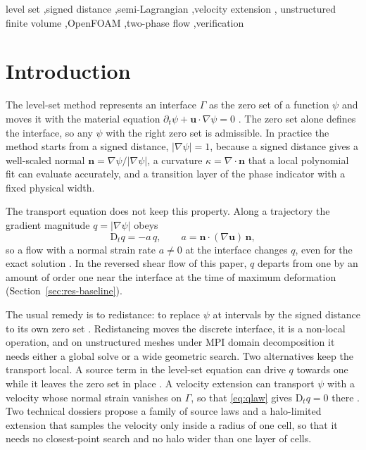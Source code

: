 \documentclass[preprint,3p,11pt]{elsarticle}
\newcommand{\psilev}{\psi}
\newcommand{\nhat}{\mathbf{n}}
\newcommand{\bu}{\mathbf{u}}
\newcommand{\Dt}{\mathrm{D}_t}
\begin{document}
\begin{frontmatter}
\begin{keyword}
level set \sep signed distance \sep semi-Lagrangian \sep velocity extension \sep
unstructured finite volume \sep OpenFOAM \sep two-phase flow \sep verification
\end{keyword}

\end{frontmatter}

\section{Introduction}
\label{sec:intro}

The level-set method represents an interface $\Gamma$ as the zero set of a function
$\psilev$ and moves it with the material equation
$\partial_t\psilev+\bu\cdot\nabla\psilev=0$ \cite{OsherSethian1988}. The zero set
alone defines the interface, so any $\psilev$ with the right zero set is admissible.
In practice the method starts from a signed distance, $|\nabla\psilev|=1$, because a
signed distance gives a well-scaled normal $\nhat=\nabla\psilev/|\nabla\psilev|$, a
curvature $\kappa=\nabla\cdot\nhat$ that a local polynomial fit can evaluate
accurately, and a transition layer of the phase indicator with a fixed physical width.

The transport equation does not keep this property. Along a trajectory the gradient
magnitude $q=|\nabla\psilev|$ obeys
\begin{equation}
  \Dt q = -a\,q,\qquad a=\nhat\cdot(\nabla\bu)\,\nhat,
  \label{eq:qlaw}
\end{equation}
so a flow with a normal strain rate $a\neq0$ at the interface changes $q$, even for
the exact solution \cite{FrickeEtAl2022,BotheFrickeSoga2024}. In the reversed shear
flow of this paper, $q$ departs from one by an amount of order one near the interface
at the time of maximum deformation (Section~\ref{sec:res-baseline}).

The usual remedy is to redistance: to replace $\psilev$ at intervals by the signed
distance to its own zero set \cite{SussmanSmerekaOsher1994,SussmanFatemi1999}.
Redistancing moves the discrete interface, it is a non-local operation, and on
unstructured meshes under MPI domain decomposition it needs either a global solve or
a wide geometric search. Two alternatives keep the transport local. A source term in
the level-set equation can drive $q$ towards one while it leaves the zero set in
place \cite{FrickeEtAl2022,BotheFrickeSoga2024}. A velocity extension can transport
$\psilev$ with a velocity whose normal strain vanishes on $\Gamma$, so that
\eqref{eq:qlaw} gives $\Dt q=0$ there \cite{AdalsteinssonSethian1999}. Two technical
dossiers \cite{BotheDossierHalo2026,BotheMaricSogaDossier2026} propose a family of
source laws and a halo-limited extension that samples the velocity only inside a
radius of one cell, so that it needs no closest-point search and no halo wider than
one layer of cells.
\end{document}
